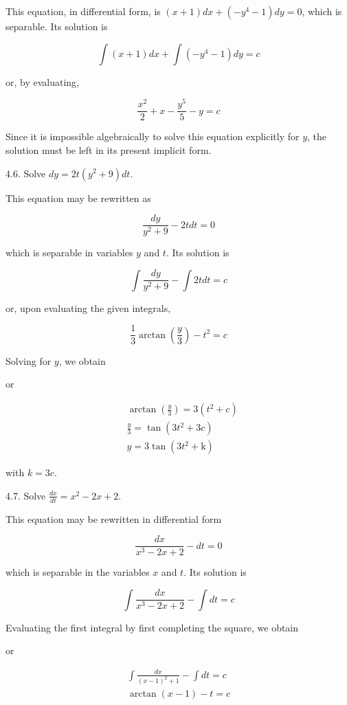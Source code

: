 \documentclass[10pt]{article}
\begin{document}
This equation, in differential form, is $(x+1) d x+\left(-y^{4}-1\right) d y=0$, which is separable. Its solution is

$$
\int(x+1) d x+\int\left(-y^{4}-1\right) d y=c
$$

or, by evaluating,

$$
\frac{x^{2}}{2}+x-\frac{y^{5}}{5}-y=c
$$

Since it is impossible algebraically to solve this equation explicitly for $y$, the solution must be left in its present implicit form.

4.6. Solve $d y=2 t\left(y^{2}+9\right) d t$.

This equation may be rewritten as

$$
\frac{d y}{y^{2}+9}-2 t d t=0
$$

which is separable in variables $y$ and $t$. Its solution is

$$
\int \frac{d y}{y^{2}+9}-\int 2 t d t=c
$$

or, upon evaluating the given integrals,

$$
\frac{1}{3} \arctan \left(\frac{y}{3}\right)-t^{2}=c
$$

Solving for $y$, we obtain

or

$$
\begin{aligned}
& \arctan \left(\frac{y}{3}\right)=3\left(t^{2}+c\right) \\
& \frac{y}{3}=\tan \left(3 t^{2}+3 c\right) \\
& y=3 \tan \left(3 t^{2}+\mathrm{k}\right)
\end{aligned}
$$

with $k=3 c$.

4.7. Solve $\frac{d x}{d t}=x^{2}-2 x+2$.

This equation may be rewritten in differential form

$$
\frac{d x}{x^{3}-2 x+2}-d t=0
$$

which is separable in the variables $x$ and $t$. Its solution is

$$
\int \frac{d x}{x^{3}-2 x+2}-\int d t=c
$$

Evaluating the first integral by first completing the square, we obtain

or

$$
\begin{gathered}
\int \frac{d x}{(x-1)^{2}+1}-\int d t=c \\
\arctan (x-1)-t=c
\end{gathered}
$$
\end{document}
